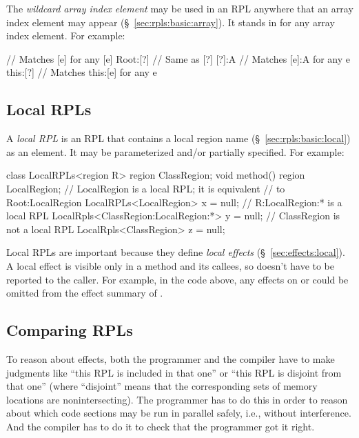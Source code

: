 The \emph{wildcard array index element} \kwd{[?]} may be used in an
RPL anywhere that an array index element \kwd{[$e$]} may appear
(\S~\ref{sec:rpls:basic:array}).  It stands in for any array index
element.  For example:
%
\begin{dpjlisting}
[?]        // Matches [e] for any [e]
Root:[?]   // Same as [?]
[?]:A      // Matches [e]:A for any e
this:[?]   // Matches this:[e] for any e
\end{dpjlisting}

\subsection{Local RPLs%
\label{sec:rpls:local}}

A \emph{local RPL} is an RPL that contains a local region name
(\S~\ref{sec:rpls:basic:local}) as an element.  It may be
parameterized and/or partially specified.  For example:
%
\begin{dpjlisting}
class LocalRPLs<region R> {
    region ClassRegion;
    void method() {
        region LocalRegion;
        // LocalRegion is a local RPL; it is equivalent 
        // to Root:LocalRegion
        LocalRPLs<LocalRegion> x = null;
        // R:LocalRegion:* is a local RPL
        LocalRpls<ClassRegion:LocalRegion:*> y = null;
        // ClassRegion is not a local RPL
        LocalRpls<ClassRegion> z = null;
    }
}
\end{dpjlisting}
%
Local RPLs are important because they define \emph{local effects}
(\S~\ref{sec:effects:local}).  A local effect is visible only in a
method and its callees, so doesn't have to be reported to the caller.
For example, in the code above, any effects on  or
 could be omitted from the effect summary of
.

\subsection{Comparing RPLs%
\label{sec:rpls:comparing}}

To reason about effects, both the programmer and the compiler have to
make judgments like ``this RPL is included in that one'' or ``this RPL
is disjoint from that one'' (where ``disjoint'' means that the
corresponding sets of memory locations are nonintersecting).  The
programmer has to do this in order to reason about which code sections
may be run in parallel safely, i.e., without interference.  And the
compiler has to do it to check that the programmer got it right.

